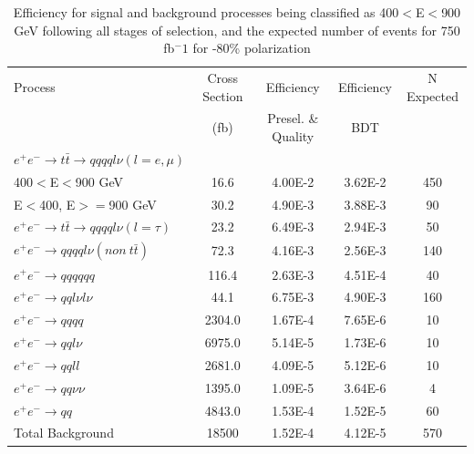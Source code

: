 \begin{table}
  \centering
  \begin{tabular}{l | c | c | c | c}
    \toprule
     Process     & Cross Section & Efficiency & Efficiency & N Expected\\
     & (fb) & Presel. \& Quality & BDT & \\
     \midrule
    $e^+e^-\rightarrow t\bar{t} \rightarrow qqqql\nu (l=e,\mu)$&  &  & &\\
    400$<$E$<$900 GeV & 16.6 & 4.00E-2 & 3.62E-2 & 450\\
    E$<$400, E$>=$900 GeV & 30.2 & 4.90E-3 & 3.88E-3 & 90\\
    \midrule
    $e^+e^-\rightarrow t\bar{t} \rightarrow qqqql\nu (l=\tau)$& 23.2 & 6.49E-3 & 2.94E-3 & 50 \\
    \midrule
    $e^+e^-\rightarrow qqqql\nu (non ~ t\bar{t})$& 72.3 & 4.16E-3 & 2.56E-3 & 140\\
    \midrule
    $e^+e^-\rightarrow qqqqqq$ & 116.4 & 2.63E-3 & 4.51E-4 & 40 \\
    \midrule
    $e^+e^-\rightarrow qql\nu l\nu$ & 44.1 & 6.75E-3 & 4.90E-3 & 160\\
    \midrule
    $e^+e^-\rightarrow qqqq$ & 2304.0 & 1.67E-4 & 7.65E-6 & 10 \\
    \midrule
    $e^+e^-\rightarrow qql\nu$ & 6975.0 & 5.14E-5 & 1.73E-6 & 10 \\
    \midrule
    $e^+e^-\rightarrow qqll$ & 2681.0 & 4.09E-5 & 5.12E-6 & 10 \\
    \midrule
    $e^+e^-\rightarrow qq\nu\nu$ & 1395.0 & 1.09E-5 & 3.64E-6 & 4 \\
    \midrule
    $e^+e^-\rightarrow qq$ & 4843.0 & 1.53E-4 & 1.52E-5 & 60\\
    \midrule
    \midrule
    Total Background & 18500 & 1.52E-4 & 4.12E-5 & 570  \\
    \bottomrule
  \end{tabular}
  \caption{Efficiency for signal and background processes being classified as 400$<$E$<$900 GeV following all stages of selection, and the expected number of events for 750 fb$^-1$ for -80\% polarization}
  \label{table:topfinalefficienciesnegLowE}
\end{table}


